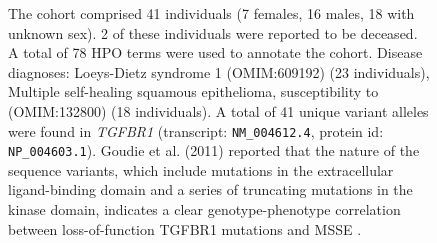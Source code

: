 \begin{figure}[htbp]
\vspace{2em}

\caption{ The cohort comprised 41 individuals (7 females, 16 males, 18 with unknown sex). 2 of these individuals were reported to be deceased. 
A total of 78 HPO terms were used to annotate the cohort. Disease diagnoses: Loeys-Dietz syndrome 1 (OMIM:609192) (23 individuals), Multiple self-healing squamous epithelioma, susceptibility to (OMIM:132800) 
(18 individuals). A total of 41 unique variant alleles were found in \textit{TGFBR1} (transcript: \texttt{NM\_004612.4}, protein id: \texttt{NP\_004603.1}).
Goudie et al. (2011) reported that the nature of the sequence variants, which include mutations in the extracellular ligand-binding domain and a series of truncating mutations in the kinase domain, 
indicates a clear genotype-phenotype correlation between loss-of-function TGFBR1 mutations and MSSE \cite{PMID_21358634}.
}
\end{figure}
